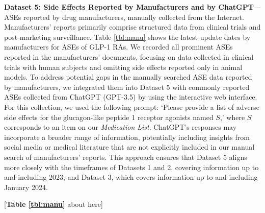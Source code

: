 \documentclass[referee,bst/sn-basic]{sn-jnl}%
\begin{document}
\textbf{Dataset 5: Side Effects Reported by Manufacturers and by ChatGPT -- }
ASEs reported by drug manufacturers, manually collected from the Internet.
Manufacturers' reports primarily comprise structured data from clinical trials and post-marketing surveillance. 
Table \ref{tbl:manu} shows the latest update dates by manufacturers for ASEs of GLP-1 RAs.
We recorded all prominent ASEs reported in the manufacturers’ documents, focusing on data collected in clinical trials with human subjects and omitting side effects reported only in animal models. 
To address potential gaps in the manually searched ASE data reported by manufacturers, we integrated them into Dataset 5 with commonly reported ASEs collected from ChatGPT (GPT-3.5) by using the interactive web interface. 
For this collection, we used the following prompt: `Please provide a list of adverse side effects for the glucagon-like peptide 1 receptor agonists named $S$,' where $S$ corresponds to an item on our \textit{Medication List}. 
ChatGPT’s responses may incorporate a broader range of information, potentially including insights from social media or medical literature that are not explicitly included in our manual search of manufacturers' reports. 
This approach ensures that Dataset 5 aligns more closely with the timeframes of Datasets 1 and 2, covering information up to and including 2023, and Dataset 3, which covers information up to and including January 2024.

\begin{center}
[\textbf{Table \ref{tbl:manu}} about here] 
\end{center}
\end{document}
